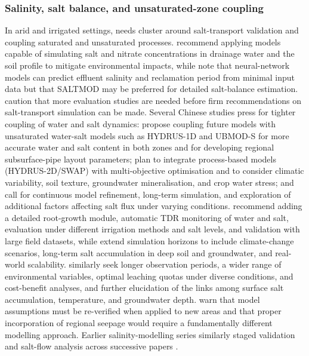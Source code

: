 \documentclass[11pt]{article}
\begin{document}
\subsubsection{Salinity, salt balance, and unsaturated-zone coupling}

In arid and irrigated settings, needs cluster around salt-transport validation and
coupling saturated and unsaturated processes. \textcite{Ebrahimian2015} recommend
applying models capable of simulating salt and nitrate concentrations in drainage
water and the soil profile to mitigate environmental impacts, while
\textcite{Sarangi2006} note that neural-network models can predict effluent
salinity and reclamation period from minimal input data but that SALTMOD may be
preferred for detailed salt-balance estimation. \textcite{Hirekhan2007} caution
that more evaluation studies are needed before firm recommendations on salt-transport
simulation can be made. Several Chinese studies press for tighter coupling of
water and salt dynamics: \textcite{Han2025} propose coupling future models with
unsaturated water-salt models such as HYDRUS-1D and UBMOD-S for more accurate
water and salt content in both zones and for developing regional subsurface-pipe
layout parameters; \textcite{Wang2025c} plan to integrate process-based models
(HYDRUS-2D/SWAP) with multi-objective optimisation and to consider climatic
variability, soil texture, groundwater mineralisation, and crop water stress; and
\textcite{Wang2024c} call for continuous model refinement, long-term simulation,
and exploration of additional factors affecting salt flux under varying
conditions. \textcite{Liu2022} recommend adding a detailed root-growth module,
automatic TDR monitoring of water and salt, evaluation under different irrigation
methods and salt levels, and validation with large field datasets, while
\textcite{Liu2026} extend simulation horizons to include climate-change scenarios,
long-term salt accumulation in deep soil and groundwater, and real-world
scalability. \textcite{Guo2025} similarly seek longer observation periods, a wider
range of environmental variables, optimal leaching quotas under diverse
conditions, and cost-benefit analyses, and further elucidation of the links among
surface salt accumulation, temperature, and groundwater depth. \textcite{Kelleners2000}
warn that model assumptions must be re-verified when applied to new areas and that
proper incorporation of regional seepage would require a fundamentally different
modelling approach. Earlier salinity-modelling series similarly staged validation
and salt-flow analysis across successive papers \parencite{KARAJEH1994}.
\end{document}
